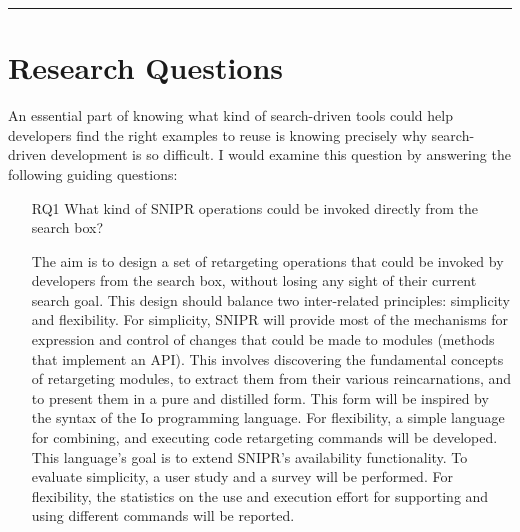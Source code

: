 \fancybreak{\pfbreakdisplay}

\section{Research Questions}
\label{sec:questions}

An essential part of knowing what kind of search-driven tools could help developers find the right examples to reuse is knowing precisely why search-driven development is so difficult. I would examine this question by answering the following guiding questions: 

\begin{itemize}
	
	\item[RQ1] What kind of \uppercase{SnipR} operations could be invoked directly from the search 
	box? 
	
	The aim is to design a set of retargeting operations that could be invoked by developers from the 
	search box, without losing any sight of their current search goal. This design should balance 
	two inter-related principles: simplicity and flexibility. For simplicity, SNIPR will provide 
	most of the mechanisms for expression and control of changes that could be made to modules 
	(methods that implement an API). This involves discovering the fundamental concepts of 
	retargeting modules, to extract them from their various reincarnations, and to present them in a 
	pure and distilled form. This form will be inspired by the syntax of the Io programming 
	language. For flexibility, a simple language for combining, and executing code 
	retargeting commands will be developed. This language's goal is to extend \uppercase{SnipR}'s 
	availability functionality. To evaluate simplicity, a user study and a survey will be performed. For 
	flexibility, the statistics on the use and execution effort for supporting and using different 
	commands will be reported.
		

\end{itemize}
